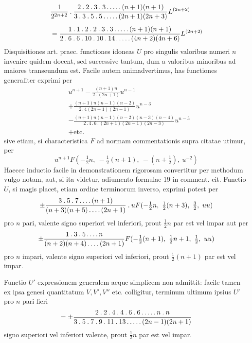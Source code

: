 \[
\begin{aligned}&\frac1{2^{2n+2}}\mathbin{.}\frac{2\mathbin{.}2\mathbin{.}3\mathbin{.}3\mathinner{.\,.\,.\,.\,.}(n+1)(n+1)}{3\mathbin{.}3\mathbin{.}5\mathbin{.}5\mathinner{.\,.\,.\,.\,.}(2n+1)(2n+3)}L^{(2n+2)}\\[5pt]&=\frac{1\mathbin{.}1\mathbin{.}2\mathbin{.}2\mathbin{.}3\mathbin{.}3\mathinner{.\,.\,.\,.\,.}(n+1)(n+1)}{2\mathbin{.}6\mathbin{.}6\mathbin{.}10\mathbin{.}10\mathbin{.}14\mathinner{.\,.\,.\,.\,.}(4n+2)(4n+6)}L^{(2n+2)}\end{aligned}
\]
Disquisitiones art. praec. functiones idoneas $U$ pro singulis valoribus numeri $n$ invenire quidem docent, sed successive tantum, dum a valoribus minoribus ad maiores transeundum est. Facile autem animadvertimus, has functiones
generaliter exprimi per
\[
\begin{aligned}&
u^{n+1}-\frac{(n+1)n}{2\mathbin{.}(2n+1)}u^{n-1}
\\[5pt]&+\frac{(n+1)n(n-1)(n-2)}{2\mathbin{.}4(2n+1)(2n-1)}u^{n-3}
\\[5pt]&-\frac{(n+1)n(n-1)(n-2)(n-3)(n-4)}{2\mathbin{.}4\mathbin{.}6\mathbin{.}(2n+1)(2n-1)(2n-3)}u^{n-5}\\ &
+\text{etc.}
\end{aligned}
\]
sive etiam, si characteristica $F$ ad normam commentationis supra citatae utimur, per
\[
u^{n+1}F(-\tfrac12n,\ -\tfrac12(n+1),\ -(n+\tfrac12),\ u^{-2})
\]
Haecce inductio facile in demonstrationem rigorosam convertitur per methodum
vulgo notam, aut, si ita videtur, adiumento formulae 19 in comment. cit. Functio
$U$, si magis placet, etiam ordine terminorum inverso, exprimi potest per
\[
\pm\frac{3\mathbin{.}5\mathbin{.}7\mathinner{.\,.\,.\,.}(n+1)}{(n+3)(n+5)\mathinner{.\,.\,.\,.}(2n+1)}\mathbin{.}uF(-\tfrac12n,\ \tfrac12(n+3),\ \tfrac32,\ uu)
\]
pro $n$ pari, valente signo superiori vel inferiori, prout $\frac12n$ par est vel impar
aut per
\[
\pm\frac{1\mathbin{.}3\mathbin{.}5\mathinner{.\,.\,.\,.} n}{(n+2)(n+4)\mathinner{.\,.\,.\,.}(2n+1)}F(-\tfrac12(n+1),\ \tfrac12n+1,\ \tfrac12,\ uu)
\]
pro $n$ impari, valente signo superiori vel inferiori, prout $\frac12(n+1)$ par est vel impar.

Functio $U'$ expressionem generalem aeque simplicem non admittit: facile
tamen ex ipsa genesi quantitatum $V,V',V''$ etc. colligitur, terminum ultimum
ipsius $U'$ pro $n$ pari fieri
\[
=\pm\frac{2\mathbin{.}2\mathbin{.}4\mathbin{.}4\mathbin{.}6\mathbin{.}6\mathinner{.\,.\,.\,.\,.} n\mathbin{.}n}{3\mathbin{.}5\mathbin{.}7\mathbin{.}9\mathbin{.}11\mathbin{.}13\mathinner{.\,.\,.\,.\,.}(2n-1)(2n+1)}
\]
signo superiori vel inferiori valente, prout $\frac12n$ par est vel impar.

